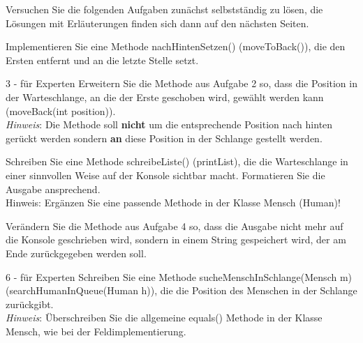 \documentclass{article}
\begin{document}
Versuchen Sie die folgenden Aufgaben zunächst selbstständig zu lösen, die Lösungen mit Erläuterungen finden sich dann auf 
den nächsten Seiten.

\begin{task}{2}
Implementieren Sie eine Methode nachHintenSetzen() (moveToBack()), die den Ersten entfernt und an die letzte
Stelle setzt.
\end{task}

\begin{task}{3 - für Experten}
Erweitern Sie die Methode aus Aufgabe 2 so, dass die Position in der Warteschlange, an die der Erste geschoben wird, gewählt werden kann (moveBack(int position)).\\
\textit{Hinweis}: Die Methode soll \textbf{nicht} um die entsprechende Position nach hinten gerückt werden sondern  \textbf{an} diese Position in der Schlange gestellt werden.
\end{task}

\begin{task}{4}
    Schreiben Sie eine Methode schreibeListe() (printList), die die Warteschlange in einer sinnvollen Weise 
    auf der Konsole sichtbar macht. Formatieren Sie die Ausgabe ansprechend. \\
    Hinweis: Ergänzen Sie eine passende Methode in der Klasse Mensch (Human)!
\end{task}

\begin{task}{5}
    Verändern Sie die Methode aus Aufgabe 4 so, dass die Ausgabe nicht mehr auf die Konsole geschrieben wird, 
    sondern in einem String gespeichert wird, der am Ende zurückgegeben werden soll. 
\end{task}

\begin{task}{6 - für Experten}
    Schreiben Sie eine Methode sucheMenschInSchlange(Mensch m) (searchHumanInQueue(Human h)), die die Position 
    des Menschen in der Schlange zurückgibt. \\
    \textit{Hinweis}: Überschreiben Sie die allgemeine equals() Methode in der Klasse Mensch, wie bei der
    Feldimplementierung.
\end{task}
\end{document}
